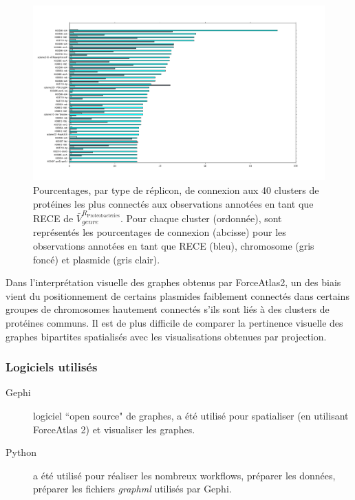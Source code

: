\begin{figure}[H]
\hspace{-2cm}
\includegraphics[trim=0cm 1cm 0cm 0cm,clip,width=1.2\textwidth, height=0.7\textheight]{./img/cluster_connectivity2.png}
\caption[Pourcentages de connexion aux clusters de protéines par type de réplicon]{Pourcentages, par type de réplicon, de connexion aux 40 clusters de protéines les plus connectés aux observations annotées en tant que RECE de $\bar{V}^{R_{\textrm{Protéobactéries}}}_{genre}$. Pour chaque cluster (ordonnée), sont représentés les pourcentages de connexion (abcisse) pour les observations annotées en tant que RECE (bleu), chromosome (gris foncé) et plasmide (gris clair).}\label{figconnectiv}
\end{figure} 

   Dans l'interprétation visuelle des graphes obtenus par ForceAtlas2, un des biais vient du positionnement de certains plasmides faiblement connectés dans certains groupes de chromosomes hautement connectés s'ils sont liés à des clusters de protéines communs. Il est de plus difficile de comparer la pertinence visuelle des graphes bipartites spatialisés avec les visualisations obtenues par projection. 

\subsubsection{Logiciels utilisés}
 \begin{description}
 \item[Gephi] \citep{Bastian2009} logiciel ``open source" de graphes, a été utilisé pour spatialiser (en utilisant ForceAtlas 2) et visualiser les graphes.
 \item[Python] a été utilisé pour réaliser les nombreux workflows, préparer les données, préparer les fichiers \textit{graphml} utilisés par Gephi. 
 \end{description}
 
